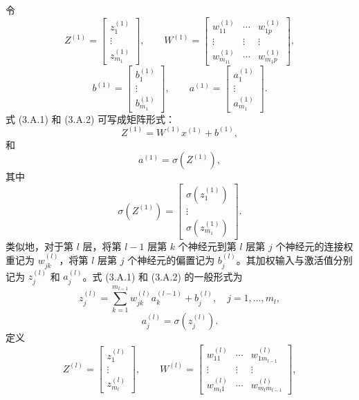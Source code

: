 令
\[
Z^{(1)}=\begin{bmatrix}z_1^{(1)}\\\vdots\\z_{m_1}^{(1)}\end{bmatrix},\qquad
W^{(1)}=\begin{bmatrix}
w_{11}^{(1)}&\cdots&w_{1p}^{(1)}\\
\vdots&\vdots&\vdots\\
w_{m_11}^{(1)}&\cdots&w_{m_1p}^{(1)}
\end{bmatrix},
\]
\[
b^{(1)}=\begin{bmatrix}b_1^{(1)}\\\vdots\\b_{m_1}^{(1)}\end{bmatrix},\qquad
a^{(1)}=\begin{bmatrix}a_1^{(1)}\\\vdots\\a_{m_1}^{(1)}\end{bmatrix}.
\]
式 (3.A.1) 和 (3.A.2) 可写成矩阵形式：
\begin{equation}
Z^{(1)}=W^{(1)}x^{(1)}+b^{(1)},
\tag{3.A.3}
\end{equation}
和
\begin{equation}
a^{(1)}=\sigma(Z^{(1)}),
\tag{3.A.4}
\end{equation}
其中
\[
\sigma(Z^{(1)})=\begin{bmatrix}\sigma(z_1^{(1)})\\\vdots\\\sigma(z_{m_1}^{(1)})\end{bmatrix}.
\]
类似地，对于第 $l$ 层，将第 $l-1$ 层第 $k$ 个神经元到第 $l$ 层第 $j$ 个神经元的连接权重记为 $w_{jk}^{(l)}$，将第 $l$ 层第 $j$ 个神经元的偏置记为 $b_j^{(l)}$。其加权输入与激活值分别记为 $z_j^{(l)}$ 和 $a_j^{(l)}$。式 (3.A.1) 和 (3.A.2) 的一般形式为
\begin{equation}
z_j^{(l)}=\sum_{k=1}^{m_{l-1}}w_{jk}^{(l)}a_k^{(l-1)}+b_j^{(l)},\quad j=1,\ldots,m_l,
\tag{3.A.5}
\end{equation}
\begin{equation}
a_j^{(l)}=\sigma(z_j^{(l)}).
\tag{3.A.6}
\end{equation}
定义
\[
Z^{(l)}=\begin{bmatrix}z_1^{(l)}\\\vdots\\z_{m_l}^{(l)}\end{bmatrix},\qquad
W^{(l)}=\begin{bmatrix}
w_{11}^{(l)}&\cdots&w_{1m_{l-1}}^{(l)}\\
\vdots&\vdots&\vdots\\
w_{m_l1}^{(l)}&\cdots&w_{m_lm_{l-1}}^{(l)}
\end{bmatrix},
\]
